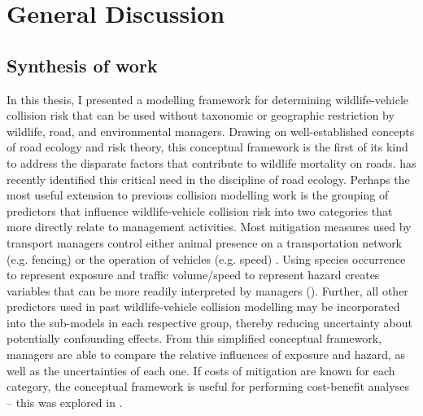 \chapter{General Discussion}\label{sec:conc}
\newpage

\section{Synthesis of work}

In this thesis, I presented a modelling framework for determining wildlife-vehicle collision risk that can be used without taxonomic or geographic restriction by wildlife, road, and environmental managers. Drawing on well-established concepts of road ecology and risk theory, this conceptual framework is the first of its kind to address the disparate factors that contribute to wildlife mortality on roads. \cite{clev15} has recently identified this critical need in the discipline of road ecology. Perhaps the most useful extension to previous collision modelling work is the grouping of predictors that influence wildlife-vehicle collision risk into two categories that more directly relate to management activities. Most mitigation measures used by transport managers control either animal presence on a transportation network (e.g. fencing) or the operation of vehicles (e.g. speed) \citep{glis09}.  Using species occurrence to represent exposure and traffic volume/speed to represent hazard creates variables that can be more readily interpreted by managers (). Further, all other predictors used in past wildlife-vehicle collision modelling may be incorporated into the sub-models in each respective group, thereby reducing uncertainty about potentially confounding effects. From this simplified conceptual framework, managers are able to compare the relative influences of exposure and hazard, as well as the uncertainties of each one. If costs of mitigation are known for each category, the conceptual framework is useful for performing cost-benefit analyses -- this was explored in .

